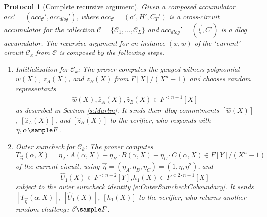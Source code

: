 \documentclass[10pt,article,oneside]{memoir}
\newtheorem{protocol}[]{Protocol}
\theoremstyle{definition}
\theoremstyle{remark}
\begin{document}
\begin{protocol}[Complete recursive argument]
\label{p:CompleteArgument}
Given a composed accumulator $acc'=(acc_{\mathcal C}',acc_{dlog}')$, where $acc_\mathcal C=(\alpha', H',C_T')$ is a cross-circuit accumulator for the collection $\mathcal C=\{\mathcal C_1,\ldots,\mathcal C_L\}$ and $acc_{dlog}'=(\vec\xi, C')$ is a dlog accumulator.
The recursive argument for an instance $(x,w)$ of the `current' circuit $\mathcal C_k$ from $\mathcal C$ is composed by the following steps.
\begin{enumerate}
\item
\textit{Intitialization for $\mathcal C_k$}:
The prover computes the gauged witness polynomial $w(X)$, $z_A(X)$, and $z_B(X)$ from $F[X]/(X^n-1)$ and chooses random representants
\begin{align*}
\hat w(X), \hat z_A(X), \hat z_B(X) \in F^{<n+1}[X]
\end{align*}
as described in Section \ref{s:Marlin}.
It sends their dlog commitments $[\hat w(X)]$, $[\hat z_A(X)]$, and $[\hat z_B(X)]$ to the verifier, who responds with $\eta,\alpha\sample F$.

\item
\textit{Outer sumcheck for $\mathcal C_k$}:
The prover computes 
\[
T_{\vec\eta}(\alpha, X)= \eta_A\cdot A(\alpha,X) + \eta_B\cdot B(\alpha,X) + \eta_C\cdot C(\alpha,X) \in F[Y]/(X^n-1)
\]
of the current circuit, using $\vec\eta=(\eta_A,\eta_B,\eta_C)=(1,\eta,\eta^2)$, and
\[
\hat U_1(X)\in  F^{<n+2}[Y], h_1(X)\in F^{< 2\cdot n + 1}[X]
\]
subject to the outer sumcheck identity \eqref{e:OuterSumcheckCoboundary}.
It sends  $[T_{\vec\eta}(\alpha, X)]$, $[\hat U_1(X)]$, $[h_1(X)]$ to the verifier, who returns another random challenge $\beta\sample F$.


\end{enumerate}
\end{protocol}
\end{document}
